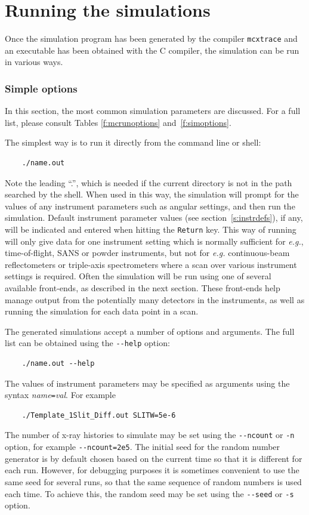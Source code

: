\section{Running the simulations}
\label{s:run-sim}

Once the simulation program has been generated by the \MCX compiler \texttt{mcxtrace}
and an executable has been obtained with the C compiler, the simulation
can be run in various ways.

\subsubsection{Simple \MCX options}
In this section, the most common simulation parameters are
discussed. For a full list, please consult Tables
\ref{f:mcrunoptions} and~\ref{f:simoptions}.

The simplest way is to run it directly from the
command line or shell:
\begin{lstlisting}
    ./name.out
\end{lstlisting}
Note the leading ``.'', which is needed if the current directory is not in the
path searched by the shell. When used in this way, the simulation will prompt
for the values of any instrument parameters such as angular settings, and then
run the simulation. Default instrument parameter values (see
section~\ref{s:instrdefs}), if any, will be indicated and entered when hitting
the \verb+Return+ key. This way of
running \MCX will only give data for one instrument setting which is normally
sufficient for {\em e.g.}, time-of-flight, SANS or powder instruments, but not
for {\em e.g.} continuous-beam reflectometers or triple-axis spectrometers where
a scan over various instrument settings is required.  Often the simulation will
be run using one of several available front-ends, as described in the next
section. These front-ends help manage output from the potentially many detectors
in the instruments, as well as running the simulation for each data point in a
scan.

The generated simulations accept a number of options and arguments. The
full list can be obtained using the \verb+--help+ option:
\begin{lstlisting}
    ./name.out --help
\end{lstlisting}
The values of instrument parameters may be specified as arguments using
the syntax \textit{name}\verb+=+\textit{val}. For example
\begin{lstlisting}
    ./Template_1Slit_Diff.out SLITW=5e-6
\end{lstlisting}
The number of x-ray histories to simulate may be set using the
\verb+--ncount+ or \verb+-n+ option, for example
\verb+--ncount=2e5+. The initial seed for the random number generator is
by default chosen based on the current time so that it is different for
each run. However, for debugging purposes it is sometimes convenient to
use the same seed for several runs, so that the same sequence of random
numbers is used each time. To achieve this, the random seed may be set
using the \verb+--seed+ or \verb+-s+ option.

